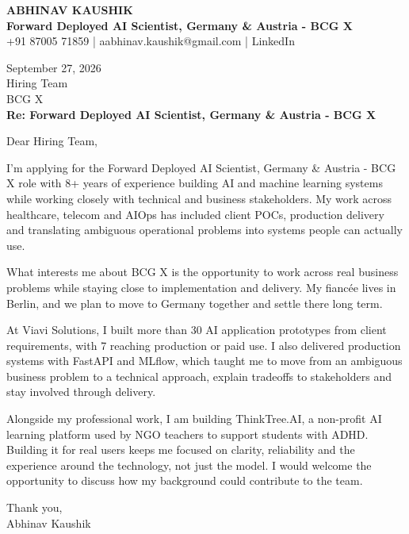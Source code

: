 \documentclass[10pt,a4paper]{article}
\begin{document}
\begin{center}
{\Large\bfseries ABHINAV KAUSHIK}\\[2pt]
{\bfseries Forward Deployed AI Scientist, Germany \& Austria - BCG X}\\[2pt]
+91 87005 71859 \quad | \quad aabhinav.kaushik@gmail.com \quad | \quad LinkedIn
\end{center}
\vspace{8pt}
September 27, 2026\\[6pt]
Hiring Team\\
BCG X\\[4pt]
\textbf{Re: Forward Deployed AI Scientist, Germany \& Austria - BCG X}

Dear Hiring Team,

I’m applying for the Forward Deployed AI Scientist, Germany \& Austria - BCG X role with 8+ years of experience building AI and machine learning systems while working closely with technical and business stakeholders. My work across healthcare, telecom and AIOps has included client POCs, production delivery and translating ambiguous operational problems into systems people can actually use.

What interests me about BCG X is the opportunity to work across real business problems while staying close to implementation and delivery. My fiancée lives in Berlin, and we plan to move to Germany together and settle there long term.

At Viavi Solutions, I built more than 30 AI application prototypes from client requirements, with 7 reaching production or paid use. I also delivered production systems with FastAPI and MLflow, which taught me to move from an ambiguous business problem to a technical approach, explain tradeoffs to stakeholders and stay involved through delivery.

Alongside my professional work, I am building ThinkTree.AI, a non-profit AI learning platform used by NGO teachers to support students with ADHD. Building it for real users keeps me focused on clarity, reliability and the experience around the technology, not just the model. I would welcome the opportunity to discuss how my background could contribute to the team.

Thank you,\\
Abhinav Kaushik
\end{document}
